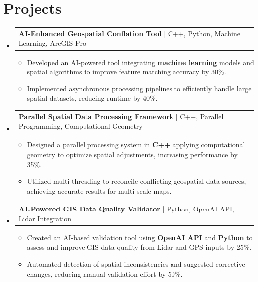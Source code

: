 \documentclass[letterpaper,11pt]{article}
\makeatletter
\newcommand{\resumeItem}[1]{
  \item\footnotesize{
    {#1 \vspace{-2pt}}
  }
}
\newcommand{\resumeProjectHeading}[2]{
    \item
    \begin{tabular*}{1.001\textwidth}{l@{\extracolsep{\fill}}r}
      \small#1 & \textbf{\small #2}\\
    \end{tabular*}\vspace{-7pt}
}
\newcommand{\resumeSubHeadingListStart}{\begin{itemize}[leftmargin=0pt, label={}]}
\newcommand{\resumeSubHeadingListEnd}{\end{itemize}}
\newcommand{\resumeItemListStart}{\begin{itemize}[leftmargin=*]}
\newcommand{\resumeItemListEnd}{\end{itemize}\vspace{-5pt}}
\makeatother
\begin{document}
\section{Projects}
    \vspace{-5pt}
    \resumeSubHeadingListStart
          \resumeProjectHeading
              {\textbf{AI-Enhanced Geospatial Conflation Tool} | C++, Python, Machine Learning, ArcGIS Pro}{}
        \resumeItemListStart
            \resumeItem{Developed an AI-powered tool integrating \textbf{machine learning} models and spatial algorithms to improve feature matching accuracy by 30\%.}
            \resumeItem{Implemented asynchronous processing pipelines to efficiently handle large spatial datasets, reducing runtime by 40\%.}
        \resumeItemListEnd
        \vspace{-12pt}
    
    \resumeProjectHeading
        {\textbf{Parallel Spatial Data Processing Framework} | C++, Parallel Programming, Computational Geometry}{}
        \resumeItemListStart
            \resumeItem{Designed a parallel processing system in \textbf{C++} applying computational geometry to optimize spatial adjustments, increasing performance by 35\%.}
            \resumeItem{Utilized multi-threading to reconcile conflicting geospatial data sources, achieving accurate results for multi-scale maps.}
        \resumeItemListEnd
          \vspace{-12pt}
      \resumeProjectHeading
          {\textbf{AI-Powered GIS Data Quality Validator} | Python, OpenAI API, Lidar Integration}{}
          \resumeItemListStart
              \resumeItem{Created an AI-based validation tool using \textbf{OpenAI API} and \textbf{Python} to assess and improve GIS data quality from Lidar and GPS inputs by 25\%.}
              \resumeItem{Automated detection of spatial inconsistencies and suggested corrective changes, reducing manual validation effort by 50\%.}
          \resumeItemListEnd 
    \resumeSubHeadingListEnd
\end{document}

